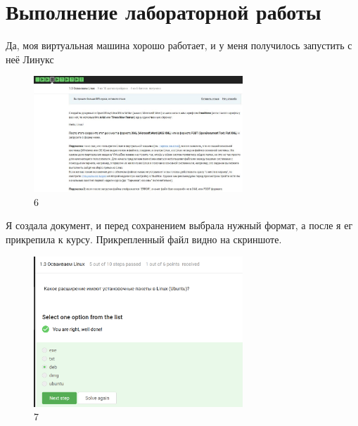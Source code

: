 \hypertarget{ux432ux44bux43fux43eux43bux43dux435ux43dux438ux435-ux43bux430ux431ux43eux440ux430ux442ux43eux440ux43dux43eux439-ux440ux430ux431ux43eux442ux44b-5}{%
\section{Выполнение лабораторной
работы}\label{ux432ux44bux43fux43eux43bux43dux435ux43dux438ux435-ux43bux430ux431ux43eux440ux430ux442ux43eux440ux43dux43eux439-ux440ux430ux431ux43eux442ux44b-5}}

Да, моя виртуальная машина хорошо работает, и у меня получилось
запустить с неё Линукс

\begin{figure}
\hypertarget{fig:006}{%
\centering
\includegraphics[width=0.7\textwidth,height=\textheight]{image/6.png}
\caption{6}\label{fig:006}
}
\end{figure}

Я создала документ, и перед сохранением выбрала нужный формат, а после я
ег прикрепила к курсу. Прикрепленный файл видно на скриншоте.

\begin{figure}
\hypertarget{fig:007}{%
\centering
\includegraphics[width=0.7\textwidth,height=\textheight]{image/7.png}
\caption{7}\label{fig:007}
}
\end{figure}

